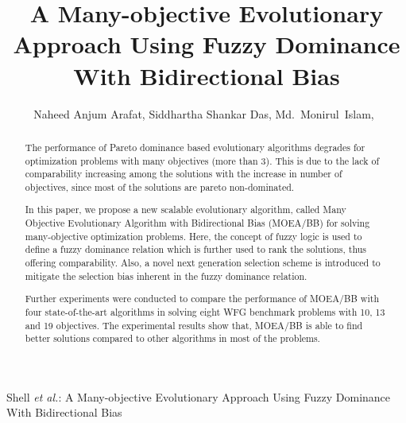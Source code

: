 \documentclass[journal]{IEEEtran}
\begin{document}
\title{ A Many-objective Evolutionary Approach Using Fuzzy Dominance With Bidirectional Bias}

\author{Naheed Anjum Arafat,
		Siddhartha Shankar Das,
        Md.~Monirul~Islam,~%
}




%
{Shell \MakeLowercase{\textit{et al.}}:  A Many-objective Evolutionary Approach Using Fuzzy Dominance With Bidirectional Bias}




\maketitle

\begin{abstract}
The performance of Pareto dominance based evolutionary algorithms degrades for optimization problems with many objectives (more than 3). This is due to the lack of comparability increasing among the solutions with the increase in number of objectives, since most of the solutions are pareto non-dominated. 

In this paper, we propose a new scalable evolutionary algorithm, called Many Objective Evolutionary Algorithm with Bidirectional Bias (MOEA/BB) for solving many-objective optimization problems. Here, the concept of fuzzy logic is used to define a fuzzy dominance relation which is further used to rank the solutions, thus offering comparability. Also, a novel next generation selection scheme is introduced to mitigate the selection bias inherent in the fuzzy dominance relation. 

Further experiments were conducted to compare the performance of MOEA/BB with four state-of-the-art algorithms in solving eight WFG benchmark problems with 10, 13 and 19 objectives. The experimental results show that, MOEA/BB is able to find better solutions compared to other algorithms in most of the problems.
\end{abstract}
\end{document}
